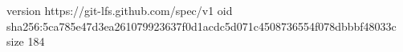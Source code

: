 version https://git-lfs.github.com/spec/v1
oid sha256:5ca785e47d3ea261079923637f0d1acdc5d071c4508736554f078dbbbf48033c
size 184
